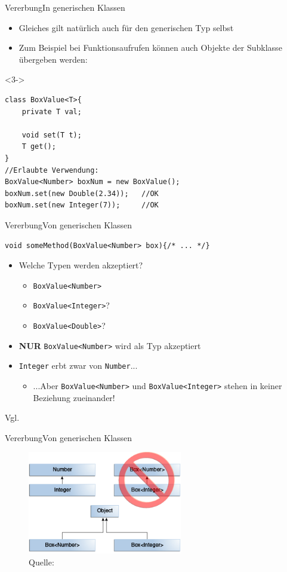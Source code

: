 \begin{frame}[fragile]{Vererbung}{In generischen Klassen}
    \begin{itemize}
        \item Gleiches gilt natürlich auch für den generischen Typ selbst
        \item<2-> Zum Beispiel bei Funktionsaufrufen können auch Objekte der Subklasse übergeben werden:
    \end{itemize}
    \lstset{style=java}
    \begin{onlyenv}<3->
    \begin{lstlisting}
class BoxValue<T>{
    private T val;
    
    void set(T t);
    T get();
}
//Erlaubte Verwendung:
BoxValue<Number> boxNum = new BoxValue();
boxNum.set(new Double(2.34));   //OK
boxNum.set(new Integer(7));     //OK
    \end{lstlisting}
    \end{onlyenv}
\end{frame}

\begin{frame}[fragile]{Vererbung}{Von generischen Klassen}
\lstset{style=java}
\begin{lstlisting}
void someMethod(BoxValue<Number> box){/* ... */}
\end{lstlisting}
\begin{itemize}
    \item<2-> Welche Typen werden akzeptiert?
    \begin{itemize}
        \item<3-> \texttt{BoxValue<Number>}
        \item<4-> \texttt{BoxValue<Integer>}?
        \item<5-> \texttt{BoxValue<Double>}?
    \end{itemize}
    \item<6-> \textbf{NUR} \texttt{BoxValue<Number>} wird als Typ akzeptiert
    \item<7-> \texttt{Integer} erbt zwar von \texttt{Number}...
    \begin{itemize}
        \item<8-> ...Aber \texttt{BoxValue<Number>} und \texttt{BoxValue<Integer>} stehen in keiner Beziehung zueinander!
    \end{itemize}
\end{itemize}
Vgl. \cite{orac:inheritance}
\end{frame}

\begin{frame}{Vererbung}{Von generischen Klassen}
    \begin{figure}
        \centering
        \includegraphics[height=4.5cm]{graph/generics-subtypeRelationship.png}
        \caption*{Quelle: \cite{orac:inheritance}}
    \end{figure}
\end{frame}
